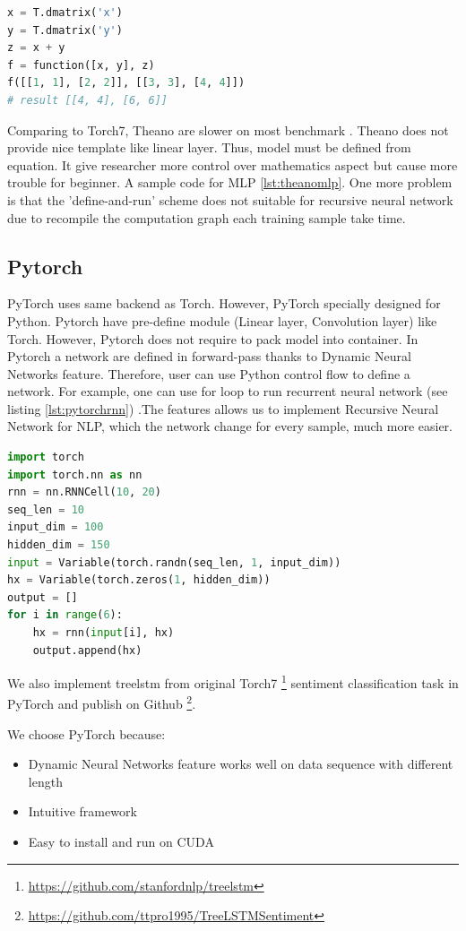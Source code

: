 \begin{lstlisting}[caption={Define function in Theano},label={lst:theanof}, language={python}]
x = T.dmatrix('x')
y = T.dmatrix('y')
z = x + y
f = function([x, y], z)
f([[1, 1], [2, 2]], [[3, 3], [4, 4]])
# result [[4, 4], [6, 6]]
\end{lstlisting}

Comparing to Torch7, Theano are slower on most benchmark \cite{collobert2011torch7}. Theano does not provide nice template like linear layer. Thus, model must be defined from equation. It give researcher more control over mathematics aspect but cause more trouble for beginner. A sample code for MLP \ref{lst:theanomlp}. One more problem is that the 'define-and-run' scheme does not suitable for recursive neural network due to recompile the computation graph each training sample take time.

\subsection{Pytorch}
PyTorch uses same backend as Torch. However, PyTorch specially designed for Python. Pytorch have pre-define module (Linear layer, Convolution layer) like Torch. However, Pytorch does not require to pack model into container. In Pytorch a network are defined in forward-pass thanks to Dynamic Neural Networks feature. Therefore, user can use Python control flow to define a network. For example, one can use for loop to run recurrent neural network (see listing \ref{lst:pytorchrnn}) .The features allows us to implement Recursive Neural Network for NLP, which the network change for every sample, much more easier.

\begin{lstlisting}[caption={RNN},label={lst:pytorchrnn}, language={python}]
import torch
import torch.nn as nn
rnn = nn.RNNCell(10, 20)
seq_len = 10
input_dim = 100
hidden_dim = 150
input = Variable(torch.randn(seq_len, 1, input_dim))
hx = Variable(torch.zeros(1, hidden_dim))
output = []
for i in range(6):
    hx = rnn(input[i], hx)
    output.append(hx)
\end{lstlisting}

We also implement treelstm from original Torch7 \footnote{\url{https://github.com/stanfordnlp/treelstm}} sentiment classification task in PyTorch and publish on Github \footnote{\url{https://github.com/ttpro1995/TreeLSTMSentiment}}.

We choose PyTorch because:
\begin{itemize}
	\item Dynamic Neural Networks feature works well on data sequence with different length
	\item Intuitive framework
	\item Easy to install and run on CUDA
\end{itemize}
